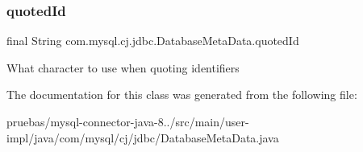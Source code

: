 \subsubsection{\texorpdfstring{quoted\+Id}{quotedId}}
{\footnotesize\ttfamily final String com.\+mysql.\+cj.\+jdbc.\+Database\+Meta\+Data.\+quoted\+Id\hspace{0.3cm}{\ttfamily [protected]}}

What character to use when quoting identifiers 

The documentation for this class was generated from the following file\+:\begin{DoxyCompactItemize}
\item 
pruebas/mysql-\/connector-\/java-\/8../src/main/user-\/impl/java/com/mysql/cj/jdbc/Database\+Meta\+Data.\+java\end{DoxyCompactItemize}
